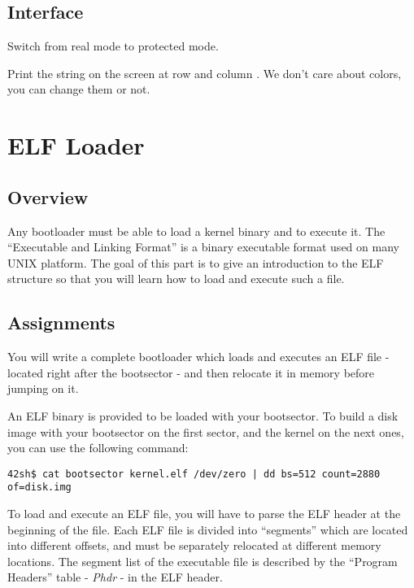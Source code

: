 \subsection*{Interface}
{
  Switch from real mode to protected mode.
}

{
  Print the string  on the screen at row 
  and column . We don't care about colors, you can change them
  or not.
}

%
%

\newpage

\section{ELF Loader}

\subsection*{Overview}
Any bootloader must be able to load a kernel binary and to execute it.
The ``Executable and Linking Format'' is a binary executable format used on
many UNIX platform. The goal of this part is to give an introduction to the
ELF structure so that you will learn how to load and execute such a file.

\subsection*{Assignments}
You will write a complete bootloader which loads and executes an ELF file
- located right after the bootsector - and then relocate it in memory
before jumping on it.

An ELF binary is provided to be loaded with your bootsector. To build
a disk image with your bootsector on the first sector, and the kernel on the
next ones, you can use the following command:

\begin{verbatim}
42sh$ cat bootsector kernel.elf /dev/zero | dd bs=512 count=2880 of=disk.img
\end{verbatim}

To load and execute an ELF file, you will have to parse the ELF header at the
beginning of the file. Each ELF file is divided into ``segments'' which are
located into different offsets, and must be separately relocated at different
memory locations. The segment list of the executable file is described by the
``Program Headers'' table - \emph{Phdr} - in the ELF header.

